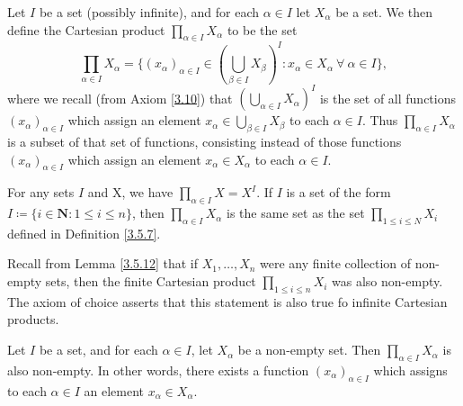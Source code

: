\begin{definition}\label{8.4.1}
    Let \(I\) be a set (possibly infinite), and for each \(\alpha \in I\) let \(X_{\alpha}\) be a set.
    We then define the Cartesian product \(\prod_{\alpha \in I} X_{\alpha}\) to be the set
    \[
        \prod_{\alpha \in I} X_{\alpha} = \Bigg\{(x_{\alpha})_{\alpha \in I} \in (\bigcup_{\beta \in I} X_{\beta})^I : x_{\alpha} \in X_{\alpha} \ \forall\ \alpha \in I\Bigg\},
    \]
    where we recall (from Axiom \ref{3.10}) that \((\bigcup_{\alpha \in I} X_{\alpha})^I\) is the set of all functions \((x_{\alpha})_{\alpha \in I}\) which assign an element \(x_{\alpha} \in \bigcup_{\beta \in I} X_{\beta}\) to each \(\alpha \in I\).
    Thus \(\prod_{\alpha \in I} X_{\alpha}\) is a subset of that set of functions, consisting instead of those functions \((x_{\alpha})_{\alpha \in I}\) which assign an element \(x_{\alpha} \in X_{\alpha}\) to each \(\alpha \in I\).
\end{definition}

\begin{example}\label{8.4.2}
    For any sets \(I\) and X, we have \(\prod_{\alpha \in I} X = X^I\).
    If \(I\) is a set of the form \(I \coloneqq \{i \in \mathbf{N} : 1 \leq i \leq n\}\), then \(\prod_{\alpha \in I} X_{\alpha}\) is the same set as the set \(\prod_{1 \leq i \leq N} X_i\) defined in Definition \ref{3.5.7}.
\end{example}

\begin{note}
    Recall from Lemma \ref{3.5.12} that if \(X_1, \dots, X_n\) were any finite collection of non-empty sets, then the finite Cartesian product \(\prod_{1 \leq i \leq n} X_i\) was also non-empty.
    The axiom of choice asserts that this statement is also true fo infinite Cartesian products.
\end{note}

\begin{axiom}[Choice]\label{8.1}
    Let \(I\) be a set, and for each \(\alpha \in I\), let \(X_{\alpha}\) be a non-empty set.
    Then \(\prod_{\alpha \in I} X_{\alpha}\) is also non-empty.
    In other words, there exists a function \((x_{\alpha})_{\alpha \in I}\) which assigns to each \(\alpha \in I\) an element \(x_{\alpha} \in X_{\alpha}\).
\end{axiom}

